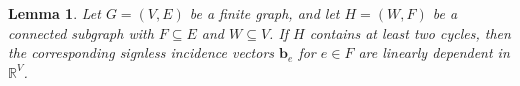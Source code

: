 \documentclass[12pt]{article}
\newtheorem{lemma}[theorem]{Lemma}
\theoremstyle{definition}
\theoremstyle{remark}
\newcommand{\tup}[1]{\left( #1 \right)}
\begin{document}

\begin{lemma}\label{twoplus_cycles}
    Let $G=(V,E)$ be a finite graph, and let $H=(W,F)$ be a connected subgraph with $F \subseteq E$ and $W \subseteq V$. If $H$ contains at least two cycles, then the corresponding signless incidence vectors $\mathbf{b}_e$ for $e \in F$ are linearly dependent in $\mathbb{R}^{V}$.
\end{lemma}
\end{document}

